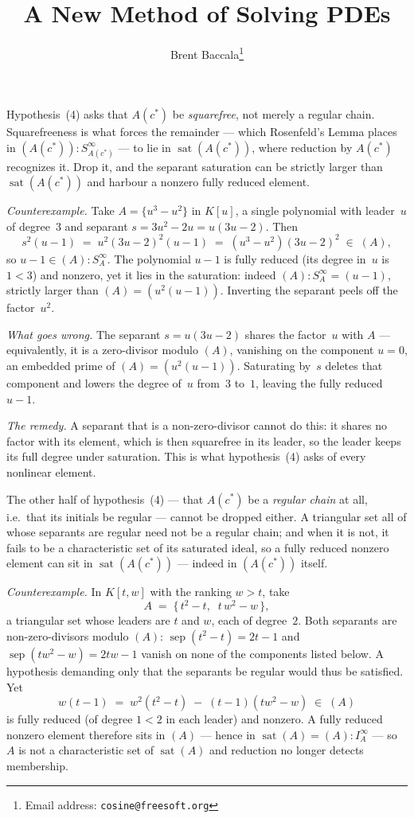 \documentclass{article}
\title{A New Method of Solving PDEs}
\author{Brent Baccala\footnote{Email address: \tt cosine@freesoft.org}}
\theoremstyle{definition}
\theoremstyle{plain}
\begin{document}
Hypothesis~(4) asks that $A(c^*)$ be {\it squarefree}, not merely a regular
chain.  Squarefreeness is what forces the remainder --- which Rosenfeld's
Lemma places in $(A(c^*)) : S_{A(c^*)}^\infty$ --- to lie in
$\operatorname{sat}(A(c^*))$, where reduction by $A(c^*)$ recognizes it.
Drop it, and the separant saturation can be strictly larger than
$\operatorname{sat}(A(c^*))$ and harbour a nonzero fully reduced element.

{\it Counterexample.}
Take $A = \{u^3 - u^2\}$ in $K[u]$, a single polynomial with leader~$u$ of
degree~$3$ and separant $s = 3u^2 - 2u = u(3u - 2)$.  Then
%
\[
s^2 (u - 1) \;=\; u^2(3u-2)^2(u-1) \;=\; (u^3 - u^2)(3u-2)^2 \;\in\; (A),
\]
%
so $u - 1 \in (A) : S_A^\infty$.  The polynomial $u - 1$ is fully reduced
(its degree in~$u$ is $1 < 3$) and nonzero, yet it lies in the saturation:
indeed $(A) : S_A^\infty = (u - 1)$, strictly larger than
$(A) = (u^2(u-1))$.  Inverting the separant peels off the factor~$u^2$.

{\it What goes wrong.}
The separant $s = u(3u - 2)$ shares the factor~$u$ with $A$ --- equivalently,
it is a zero-divisor modulo $(A)$, vanishing on the component $u = 0$, an
embedded prime of $(A) = (u^2(u-1))$.  Saturating by~$s$ deletes that
component and lowers the degree of~$u$ from~$3$ to~$1$, leaving the fully
reduced $u - 1$.

{\it The remedy.}
A separant that is a non-zero-divisor cannot do this: it shares no factor
with its element, which is then squarefree in its leader, so the leader
keeps its full degree under saturation.  This is what hypothesis~(4) asks
of every nonlinear element.

\vfill\eject

\medskip
{}
The other half of hypothesis~(4) --- that $A(c^*)$ be a {\it regular chain}
at all, i.e.\ that its initials be regular --- cannot be dropped either.  A
triangular set all of whose separants are regular need not be a regular
chain; and when it is not, it fails to be a characteristic set of its
saturated ideal, so a fully reduced nonzero element can sit in
$\operatorname{sat}(A(c^*))$ --- indeed in $(A(c^*))$ itself.

{\it Counterexample.}
In $K[t, w]$ with the ranking $w > t$, take
%
\[
A \;=\; \{\, t^2 - t, \;\; t\,w^2 - w \,\},
\]
%
a triangular set whose leaders are $t$ and $w$, each of degree~$2$.  Both
separants are non-zero-divisors modulo $(A)$:
$\operatorname{sep}(t^2 - t) = 2t - 1$ and
$\operatorname{sep}(t w^2 - w) = 2tw - 1$ vanish on none of the components
listed below.  A hypothesis demanding only that the separants be regular
would thus be satisfied.  Yet
%
\[
w(t - 1) \;=\; w^2 (t^2 - t) \;-\; (t-1)(t w^2 - w) \;\in\; (A)
\]
%
is fully reduced (of degree $1 < 2$ in each leader) and nonzero.  A fully
reduced nonzero element therefore sits in $(A)$ --- hence in
$\operatorname{sat}(A) = (A) : I_A^\infty$ --- so $A$ is not a characteristic
set of $\operatorname{sat}(A)$ and reduction no longer detects membership.
\end{document}
